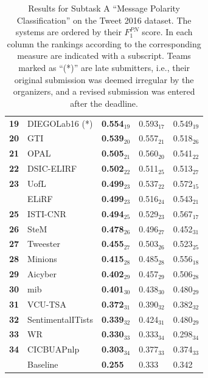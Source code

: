 \documentclass[11pt,letterpaper]{article}
\newif\ifdraft
\newcommand{\fabrizio}[1]{\ifdraft{\textcolor{cyan}{[Fabrizio]: {#1}}}\else{\vspace{0ex}}\fi}
\begin{document}
\begin{table}[tbh]
\begin{small}
{\begin{tabular}{|c|l|l|l|l|}
      \bf 19 & DIEGOLab16 (*) & \bf 0.554$_{19}$ & 0.593$_{17}$ & 0.549$_{19}$ \\
      \bf 20 & GTI & \bf 0.539$_{20}$ & 0.557$_{21}$ & 0.518$_{26}$ \\
      \bf 21 & OPAL & \bf 0.505$_{21}$ & 0.560$_{20}$ & 0.541$_{22}$ \\
      \bf 22 & DSIC-ELIRF & \bf 0.502$_{22}$ & 0.511$_{25}$ & 0.513$_{27}$ \\
      \bf 23 & UofL & \bf 0.499$_{23}$ & 0.537$_{22}$ & 0.572$_{15}$ \\
      & ELiRF & \bf 0.499$_{23}$ & 0.516$_{24}$ & 0.543$_{21}$ \\
      \bf 25 & ISTI-CNR & \bf 0.494$_{25}$ & 0.529$_{23}$ & 0.567$_{17}$ \\
      \bf 26 & SteM & \bf 0.478$_{26}$ & 0.496$_{27}$ & 0.452$_{31}$ \\
      \bf 27 & Tweester & \bf 0.455$_{27}$ & 0.503$_{26}$ & 0.523$_{25}$ \\
      \bf 28 & Minions & \bf 0.415$_{28}$ & 0.485$_{28}$ & 0.556$_{18}$ \\
      \bf 29 & Aicyber & \bf 0.402$_{29}$ & 0.457$_{29}$ & 0.506$_{28}$ \\
      \bf 30 & mib & \bf 0.401$_{30}$ & 0.438$_{30}$ & 0.480$_{29}$ \\
      \bf 31 & VCU-TSA & \bf 0.372$_{31}$ & 0.390$_{32}$ & 0.382$_{32}$ \\
      \bf 32 & SentimentalITists & \bf 0.339$_{32}$ & 0.424$_{31}$ & 0.480$_{29}$ \\
      \bf 33 & WR & \bf 0.330$_{33}$ & 0.333$_{34}$ & 0.298$_{34}$ \\
      \bf 34 & CICBUAPnlp & \bf 0.303$_{34}$ & 0.377$_{33}$ & 0.374$_{33}$ \\
      \hline\rule[0ex]{0mm}{2ex} 
      & Baseline & \bf 0.255 & 0.333 & 0.342 \\ 
      \hline
    \end{tabular}
    }
\caption{\label{table:ResultsSubtaskA} Results for Subtask A ``Message Polarity Classification'' on the Tweet 2016 dataset. The systems are ordered by their $F_1^{PN}$ score. In each column the rankings according to the corresponding measure are indicated with a subscript. Teams marked as ``(*)'' are late submitters, i.e., their original submission was deemed irregular by the organizers, and a revised submission was entered after the deadline.
}
\end{small}
\end{table}
\renewcommand{\baselinestretch}{1.00}
\end{document}
